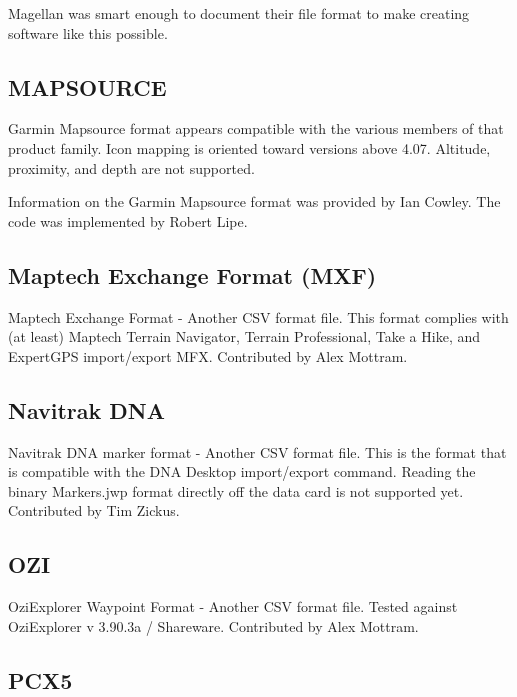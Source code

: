 \documentclass[12pt]{article}
\begin{document}
	Magellan was smart enough to document their file format to make
	creating software like this possible.



\subsection{MAPSOURCE}

        Garmin Mapsource format appears compatible with the various
        members of that product family.  Icon mapping is oriented toward
        versions above 4.07.  Altitude, proximity, and depth are not
        supported.

        Information on the Garmin Mapsource format was provided by Ian
        Cowley.  The code was implemented by Robert Lipe.



\subsection{Maptech Exchange Format (MXF)}

        Maptech Exchange Format - Another CSV format file.  This format
        complies with (at least) Maptech Terrain Navigator, Terrain
        Professional, Take a Hike, and ExpertGPS import/export MFX.
        Contributed by Alex Mottram.



\subsection{Navitrak DNA}

	Navitrak DNA marker format - Another CSV format file.
	This is the format that is compatible with the DNA Desktop
	import/export command.  Reading the binary Markers.jwp 
	format directly off the data card is not supported yet.
	Contributed by Tim Zickus.



\subsection{OZI}

        OziExplorer Waypoint Format - Another CSV format file.  Tested
        against OziExplorer v 3.90.3a / Shareware.  Contributed by Alex
        Mottram.



\subsection{PCX5}
\end{document}

